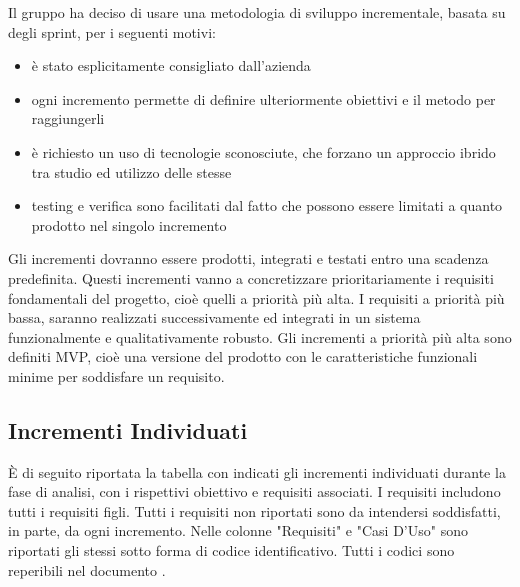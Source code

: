 Il gruppo ha deciso di usare una metodologia di sviluppo incrementale, 
basata su degli sprint, per i seguenti motivi:
\begin{itemize}
    \item 
        è stato esplicitamente consigliato dall'azienda
    \item 
        ogni incremento permette di definire ulteriormente 
        obiettivi e il metodo per raggiungerli
    \item 
        è richiesto un uso di tecnologie sconosciute, che forzano un 
        approccio ibrido tra studio ed utilizzo delle stesse
    \item
        testing e verifica sono facilitati dal fatto che possono essere 
        limitati a quanto prodotto nel singolo incremento
\end{itemize}
Gli incrementi dovranno essere prodotti, integrati e testati entro
una scadenza predefinita. Questi incrementi vanno a concretizzare 
prioritariamente i requisiti fondamentali del progetto, cioè quelli a 
priorità più alta. I requisiti a priorità più bassa, saranno realizzati
successivamente ed integrati in un sistema funzionalmente e qualitativamente robusto.
Gli incrementi a priorità più alta sono definiti MVP, cioè una versione
del prodotto con le caratteristiche funzionali minime per soddisfare un requisito.

\subsection{Incrementi Individuati}
È di seguito riportata la tabella con indicati gli incrementi individuati durante la fase 
di analisi, con i rispettivi obiettivo e requisiti associati. 
I requisiti includono tutti i requisiti figli. Tutti i requisiti non riportati sono da 
intendersi soddisfatti, in parte, da ogni incremento.
Nelle colonne "Requisiti" e "Casi D'Uso" sono riportati gli stessi sotto forma di codice 
identificativo. Tutti i codici sono reperibili nel documento \AdR.

